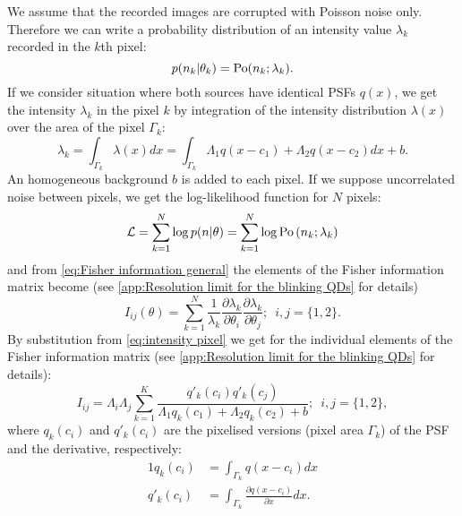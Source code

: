 We assume that the recorded images are corrupted with Poisson noise only. Therefore we can write a probability distribution of an intensity value $\lambda_k$ recorded in the $k$th pixel:
%
\begin{equation*}
	p(n_k|\theta_k)=\mathrm{Po}(n_k;\lambda_k).
\end{equation*}
%
If we consider situation where both sources have identical PSFs $q(x)$, we get the intensity $\lambda_k$ in the pixel $k$ by integration of the intensity distribution $\lambda(x)$ over the area of the pixel $\Gamma_k$:
%
\begin{equation}
	\lambda_k=\int_{\Gamma_k}\lambda(x)dx=\int_{\Gamma_k}\Lambda_1q(x-c_1)+\Lambda_2q(x-c_2)dx+b.
	\label{eq:intensity pixel}
\end{equation}
%
An homogeneous background $b$ is added to each pixel. If we suppose uncorrelated noise between pixels, we get the log-likelihood function for $N$ pixels: 
%
\begin{equation}
	\mathcal{L}=\sum_{k=1}^N\log p(n|\theta)=\sum_{k=1}^N\log\mathrm{Po}\left(n_k;\lambda_k\right)
	\label{eq:FREM likekihood Poisson}
\end{equation}
%
and from \autoref{eq:Fisher information general} the elements of the Fisher information matrix become (see \autoref{app:Resolution limit for the blinking QDs} for details)
%
\begin{equation}
	I_{ij}(\theta)=\sum_{k=1}^N\frac{1}{\lambda_k}\frac{\partial\lambda_k}{\partial\theta_i}\frac{\partial\lambda_k}{\partial\theta_j};\; \ i,j=\{1,2\}.
	\label{eq:FI - entries}
\end{equation}
%
By substitution from \autoref{eq:intensity pixel} we get for the individual elements of the Fisher information matrix (see \autoref{app:Resolution limit for the blinking QDs} for details): 
%
\begin{equation}
	I_{ij} =\Lambda_i\Lambda_j\sum_{k=1}^{K}\frac{q'_k(c_i)q'_k(c_j)}{\Lambda_1q_k(c_1)+\Lambda_2q_k(c_2)+b};\; \ i,j=\{1,2\},
	\label{eq:FI - individual}
\end{equation}
%
where $q_k(c_i)$ and $q'_k(c_i)$ are the pixelised versions (pixel area $\Gamma_k$) of the PSF and the derivative, respectively:
%
\begin{alignat*}{1}
	q_k(c_i) & =\int_{\Gamma_k}q(x-c_i)dx\\
	q'_k(c_i) & =\int_{\Gamma_k}\frac{\partial q(x-c_i)}{\partial x}dx.
\end{alignat*}
%

